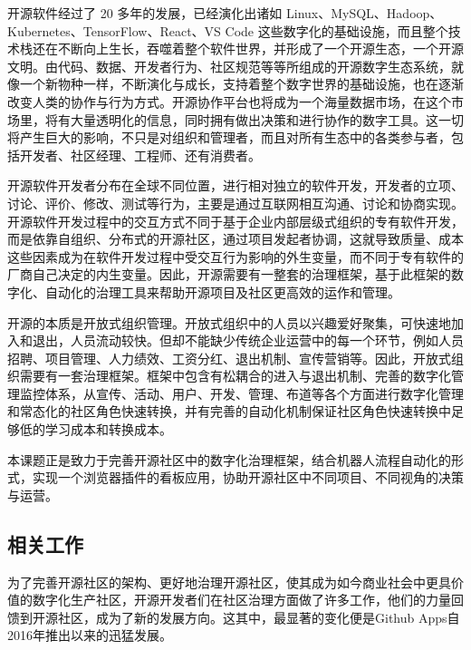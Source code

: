 \par 开源软件经过了 20 多年的发展，已经演化出诸如 Linux、MySQL、Hadoop、Kubernetes、TensorFlow、React、VS Code 这些数字化的基础设施，而且整个技术栈还在不断向上生长，吞噬着整个软件世界，并形成了一个开源生态，一个开源文明\cite{万江平20092020}。由代码、数据、开发者行为、社区规范等等所组成的开源数字生态系统，就像一个新物种一样，不断演化与成长，支持着整个数字世界的基础设施，也在逐渐改变人类的协作与行为方式。开源协作平台也将成为一个海量数据市场，在这个市场里，将有大量透明化的信息，同时拥有做出决策和进行协作的数字工具。这一切将产生巨大的影响，不只是对组织和管理者，而且对所有生态中的各类参与者，包括开发者、社区经理、工程师、还有消费者\cite{martinez2014current}。

\par 开源软件开发者分布在全球不同位置，进行相对独立的软件开发，开发者的立项、讨论、评价、修改、测试等行为，主要是通过互联网相互沟通、讨论和协商实现\cite{王怀民2014基于网络的可信软件大规模协同开发与演化}。开源软件开发过程中的交互方式不同于基于企业内部层级式组织的专有软件开发，而是依靠自组织、分布式的开源社区，通过项目发起者协调，这就导致质量、成本这些因素成为在软件开发过程中受交互行为影响的外生变量，而不同于专有软件的厂商自己决定的内生变量。\cite{李其锋2014面向开源社区的开发者群体行为分析方法}因此，开源需要有一整套的治理框架，基于此框架的数字化、自动化的治理工具来帮助开源项目及社区更高效的运作和管理。

\par 开源的本质是开放式组织管理。开放式组织中的人员以兴趣爱好聚集，可快速地加入和退出，人员流动较快。但却不能缺少传统企业运营中的每一个环节，例如人员招聘、项目管理、人力绩效、工资分红、退出机制、宣传营销等\cite{李存燕2019github中开发人员的行为特征分析}。因此，开放式组织需要有一套治理框架。框架中包含有松耦合的进入与退出机制、完善的数字化管理监控体系，从宣传、活动、用户、开发、管理、布道等各个方面进行数字化管理和常态化的社区角色快速转换，并有完善的自动化机制保证社区角色快速转换中足够低的学习成本和转换成本\cite{杨波2017github开源软件开发过程中影响因素的相关性分析}。

\par 本课题正是致力于完善开源社区中的数字化治理框架，结合机器人流程自动化的形式，实现一个浏览器插件的看板应用，协助开源社区中不同项目、不同视角的决策与运营。


\subsection{相关工作}
\par 为了完善开源社区的架构、更好地治理开源社区，使其成为如今商业社会中更具价值的数字化生产社区，开源开发者们在社区治理方面做了许多工作，他们的力量回馈到开源社区，成为了新的发展方向。这其中，最显著的变化便是Github Apps自2016年推出以来的迅猛发展。

